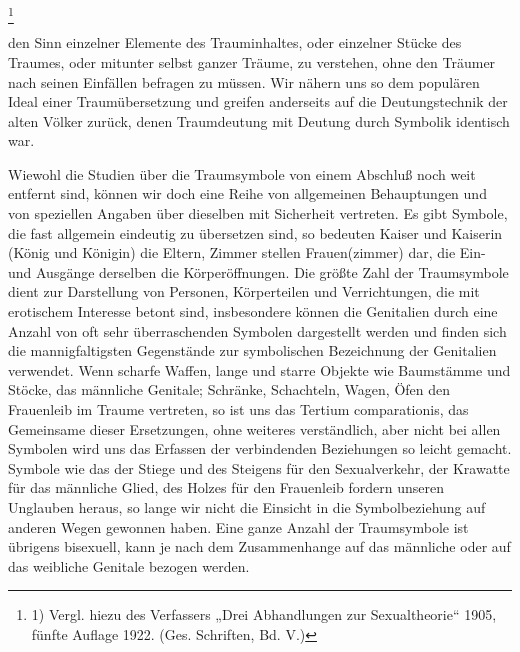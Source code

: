 \documentclass[twoside=true,titlepage=false,open=any, parskip=never, fontsize=10pt, headings=small, chapterprefix=false, appendixprefix=false]{scrbook}
\begin{document}
            
        \footnote{1) Vergl. hiezu des
               Verfassers „Drei Abhandlungen zur Sexualtheorie“ 1905, fünfte Auflage 1922.
               (Ges. Schriften, Bd. V.)}
    
         
            
            
            
        \pstart
        den Sinn einzelner Elemente des Trauminhaltes, oder einzelner Stücke
               des Traumes, oder mitunter selbst ganzer Träume, zu verstehen, ohne den Träumer
               nach seinen Einfällen befragen zu müssen. Wir nähern uns so dem populären Ideal
               einer Traumübersetzung und greifen anderseits auf die Deutungstechnik
               der alten Völker zurück, denen Traumdeutung mit Deutung durch Symbolik
               identisch war.
        \pend
    
            
        \pstart
        Wiewohl die Studien über die Traumsymbole von einem Abschluß noch weit entfernt
               sind, können wir doch eine Reihe von allgemeinen Behauptungen und von speziellen
               Angaben über dieselben mit Sicherheit vertreten. Es gibt Symbole, die fast
               allgemein eindeutig zu übersetzen sind, so bedeuten Kaiser und Kaiserin (König
               und Königin) die Eltern, Zimmer stellen Frauen(zimmer) dar, die Ein- und
               Ausgänge derselben die Körperöffnungen. Die größte Zahl der
               Traumsymbole dient zur Darstellung von Personen, Körperteilen und
               Verrichtungen, die mit erotischem Interesse betont sind, insbesondere können
               die Genitalien durch eine Anzahl von oft sehr überraschenden Symbolen
               dargestellt werden und finden sich die mannigfaltigsten Gegenstände zur
               symbolischen Bezeichnung der Genitalien verwendet. Wenn scharfe
               Waffen, lange und starre Objekte wie Baumstämme und Stöcke, das männliche
               Genitale; Schränke, Schachteln, Wagen, Öfen den Frauenleib im Traume
               vertreten, so ist uns das Tertium comparationis, das Gemeinsame dieser
               Ersetzungen, ohne weiteres verständlich, aber nicht bei allen Symbolen wird uns
               das Erfassen der verbindenden Beziehungen so leicht gemacht. Symbole wie das der
               Stiege und des Steigens für den Sexualverkehr, der Krawatte für das männliche
               Glied, des Holzes für den Frauenleib fordern unseren Unglauben heraus, so
               lange wir nicht die Einsicht in die Symbolbeziehung auf anderen Wegen gewonnen
               haben. Eine ganze Anzahl der Traumsymbole ist übrigens bisexuell, kann je nach
               dem Zusammenhange auf das männliche oder auf das weibliche Genitale bezogen
               werden.
        \pend
    
\end{document}
